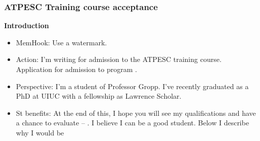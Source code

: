 \begin{frame}[label = atpesc]
\frametitle{ATPESC Training course acceptance} 
\textbf{Introduction}
\begin{itemize} 

\tiny \item \tiny MemHook: Use a watermark. 

\item \tiny Action: I'm writing for admission to the ATPESC training
  course.  Application for admission to program . 

\item \tiny Perspective: I'm a student of Professor Gropp. I've recently 
graduated as a PhD at UIUC with a fellowship as Lawrence Scholar. 

\item \tiny St benefits: At the end of this, I hope you will see my
  qualifications and have a chance to evaluate  -- . I believe I can
  be a good student. Below I describe why I would be  
\end{itemize}


\end{frame}
